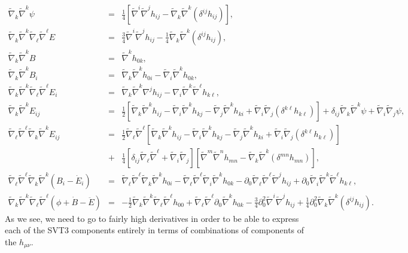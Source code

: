 \documentclass[aps,onecolumn,10pt]{revtex4}
\numberwithin{equation}{section}
\numberwithin{equation}{section}
\begin{document}
\begin{eqnarray}
\tilde{\nabla}_k\tilde{\nabla}^k\psi&=&\frac{1}{4} \left[\tilde{\nabla}^i \tilde{\nabla}^jh_{ij}-\tilde{\nabla}_k\tilde{\nabla}^k(\delta^{ij}h_{ij})\right],
\nonumber\\
\tilde{\nabla}_k\tilde{\nabla}^k\tilde{\nabla}_{\ell}\tilde{\nabla}^{\ell}E&=&\frac{3}{4} \tilde{\nabla}^i \tilde{\nabla}^jh_{ij}-\frac{1}{4}\tilde{\nabla}_k\tilde{\nabla}^k(\delta^{ij}h_{ij}),
\nonumber\\
\tilde{\nabla}_k\tilde{\nabla}^kB&=&\tilde{\nabla}^kh_{0k},
\nonumber\\
\tilde{\nabla}_k\tilde{\nabla}^kB_i&=&\tilde{\nabla}_k\tilde{\nabla}^kh_{0i}-\tilde{\nabla}_i\tilde{\nabla}^kh_{0k},
  \nonumber\\
 \tilde{\nabla}_k\tilde{\nabla}^k\tilde{\nabla}_{\ell}\tilde{\nabla}^{\ell}E_i&=&\tilde{\nabla}_k\tilde{\nabla}^k\nabla^jh_{ij}-\nabla_i\tilde{\nabla}^k\tilde{\nabla}^{\ell}h_{k\ell},
 \nonumber\\
 \tilde{\nabla}_k\tilde{\nabla}^kE_{ij}&=&\frac{1}{2}\left[\tilde{\nabla}_k\tilde{\nabla}^kh_{ij}-\tilde{\nabla}_i\tilde{\nabla}^kh_{kj}-\tilde{\nabla}_j\tilde{\nabla}^kh_{ki}+\tilde{\nabla}_i\tilde{\nabla}_j(\delta^{k\ell}h_{k\ell})\right]
 +\delta_{ij}\tilde{\nabla}_k\tilde{\nabla}^k\psi+\tilde{\nabla}_i\tilde{\nabla}_j\psi,
 \nonumber\\
 \tilde{\nabla}_{\ell}\tilde{\nabla}^{\ell}\tilde{\nabla}_k\tilde{\nabla}^kE_{ij}&=&
\frac{1}{2} \tilde{\nabla}_{\ell}\tilde{\nabla}^{\ell}\left[\tilde{\nabla}_k\tilde{\nabla}^kh_{ij}-\tilde{\nabla}_i\tilde{\nabla}^kh_{kj}-\tilde{\nabla}_j\tilde{\nabla}^kh_{ki}+\tilde{\nabla}_i\tilde{\nabla}_j(\delta^{k\ell}h_{k\ell})\right]
 \nonumber\\
&+&\frac{1}{4}\left[\delta_{ij}\tilde{\nabla}_{\ell}\tilde{\nabla}^{\ell}+\tilde{\nabla}_i\tilde{\nabla}_j \right]\left[\tilde{\nabla}^m \tilde{\nabla}^nh_{mn}-\tilde{\nabla}_k\tilde{\nabla}^k(\delta^{mn}h_{mn}) \right],
\nonumber\\
\tilde{\nabla}_{\ell}\tilde{\nabla}^{\ell} \tilde{\nabla}_k\tilde{\nabla}^k(B_i-\dot{E}_i)&=&
\tilde{\nabla}_{\ell}\tilde{\nabla}^{\ell}\tilde{\nabla}_k\tilde{\nabla}^kh_{0i}
-\tilde{\nabla}_{\ell}\tilde{\nabla}^{\ell}\tilde{\nabla}_i\tilde{\nabla}^kh_{0k}
-\partial_0\tilde{\nabla}_{\ell}\tilde{\nabla}^{\ell}\tilde{\nabla}^jh_{ij}
+\partial_0\tilde{\nabla}_{i}\tilde{\nabla}^{k}\tilde{\nabla}^{\ell}h_{k\ell},
\nonumber\\
 \tilde{\nabla}_k\tilde{\nabla}^k\tilde{\nabla}_{\ell}\tilde{\nabla}^{\ell}(\phi+\dot{B}-\ddot{E})&=&
 -\tfrac{1}{2}\tilde{\nabla}_k\tilde{\nabla}^k\tilde{\nabla}_{\ell}\tilde{\nabla}^{\ell}h_{00}
 +\tilde{\nabla}_{\ell}\tilde{\nabla}^{\ell}\partial_0\tilde{\nabla}^kh_{0k}
 -\tfrac{3}{4}\partial_0^2\tilde{\nabla}^i\tilde{\nabla}^jh_{ij}
  +\tfrac{1}{4}\partial_0^2\tilde{\nabla}_{k}\tilde{\nabla}^{k}(\delta^{ij}h_{ij}).
\label{2.6}
 \end{eqnarray}
As we see, we need to go to fairly high derivatives in order to be able to express each of the SVT3 components entirely in terms of combinations of components of the $h_{\mu\nu}$.
\end{document}
